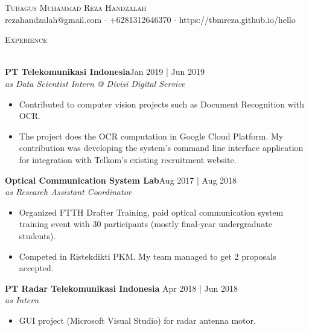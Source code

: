 \documentclass[a4paper]{article}
\newcommand{\lineunder} {
    \vspace*{-8pt} \\
    \hspace*{-18pt} \hrulefill \\
}
\newcommand{\header} [1] {
    {\hspace*{-18pt}\vspace*{6pt} \textsc{#1}}
    \vspace*{-6pt} \lineunder
}
\begin{document}
\vspace*{-40pt}

    

\vspace*{-10pt}
\begin{center}
	{\Large \scshape {Tubagus Muhammad Reza Handzalah}}\\
	rezahandzalah@gmail.com $\cdot$ +6281312646370 $\cdot$ https://tbmreza.github.io/hello\\
\end{center}

\header{Experience}
\vspace{1mm}

\textbf{PT Telekomunikasi Indonesia}\hfill Jan 2019 | Jun 2019\\
\textit{as Data Scientist Intern @ Divisi Digital Service}\\
\vspace{-1mm}
\begin{itemize} \itemsep 1pt
	\item Contributed to computer vision projects such as Document Recognition with OCR.
	\item The project does the OCR computation in Google Cloud Platform. My contribution was developing the system's command line interface application for integration with Telkom's existing recruitment website.
\end{itemize}
\vspace{1mm}

\textbf{Optical Communication System Lab}\hfill Aug 2017 | Aug 2018\\
\textit{as Research Assistant Coordinator} \\
\vspace{-1mm}
\begin{itemize} \itemsep 1pt
  \item Organized FTTH Drafter Training, paid optical communication system training event with 30 participants (mostly final-year undergraduate students).
  \item Competed in Ristekdikti PKM. My team managed to get 2 proposals accepted.
  
\end{itemize}
\vspace{1mm}

\textbf{PT Radar Telekomunikasi Indonesia} \hfill Apr 2018 | Jun 2018\\
\textit{as Intern}\\
\vspace{-1mm}
\begin{itemize} \itemsep 1pt
	\item GUI project (Microsoft Visual Studio) for radar antenna motor.
  
\end{itemize}
\end{document}
